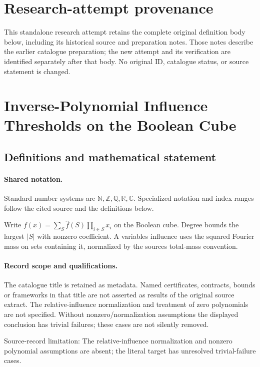 \documentclass[11pt]{article}
\begin{document}
\section*{Research-attempt provenance}
This standalone research attempt retains the complete original definition body below,
including its historical source and preparation notes. Those notes describe the
earlier catalogue preparation; the new attempt and its verification are identified
separately after that body. No original ID, catalogue status, or source statement is changed.

\section{Inverse-Polynomial Influence Thresholds on the Boolean Cube}\label{statement}

\subsection{Definitions and mathematical statement}

\paragraph{Shared notation.}Standard number systems are $\mathbb N,\mathbb Z,\mathbb Q,\mathbb R,\mathbb C$. Specialized notation and index ranges follow the cited source and the definitions below.


Write $f(x)=\sum_S\widehat f(S)\prod_{i\in S}x_i$ on the Boolean cube. Degree bounds the largest $|S|$ with nonzero coefficient. A variable\textquotesingle s influence uses the squared Fourier mass on sets containing it, normalized by the source\textquotesingle s total-mass convention.
\paragraph{Record scope and qualifications.}
The catalogue title is retained as metadata. Named certificates, contracts, bounds or frameworks in that title are not asserted as results of the original source extract.
The relative-influence normalization and treatment of zero polynomials are not specified. Without nonzero/normalization assumptions the displayed conclusion has trivial failures; these cases are not silently removed.

Source-record limitation: The relative-influence normalization and nonzero polynomial assumptions are absent; the literal target has unresolved trivial-failure cases.
\end{document}
